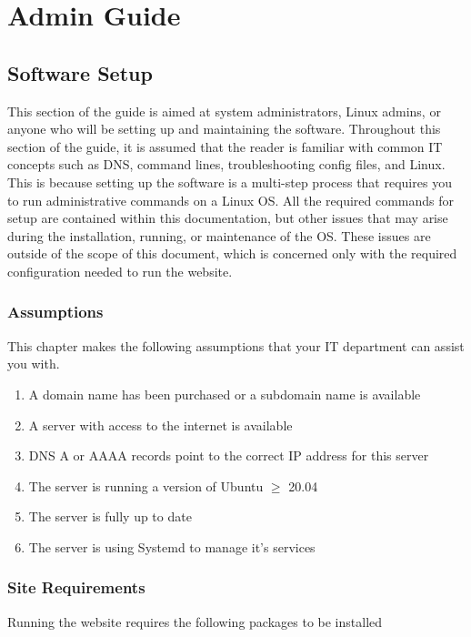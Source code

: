 \part{Admin Guide} \label{administrative_guide}
\chapter{Software Setup} \label{software_setup}
This section of the guide is aimed at system administrators, Linux admins, or anyone who will be setting up and maintaining the software. Throughout this section of the guide, it is assumed that the reader is familiar with common IT concepts such as DNS, command lines, troubleshooting config files, and Linux. This is because setting up the software is a multi-step process that requires you to run administrative commands on a Linux OS. All the required commands for setup are contained within this documentation, but other issues that may arise during the installation, running, or maintenance of the OS. These issues are outside of the scope of this document, which is concerned only with the required configuration needed to run the website.

\section{Assumptions}

This chapter makes the following assumptions that your IT department can assist you with.

\begin{enumerate}
    \item A domain name has been purchased or a subdomain name is available
    \item A server with access to the internet is available
    \item DNS A or AAAA records point to the correct IP address for this server
    \item The server is running a version of Ubuntu $\geq$ 20.04
    \item The server is fully up to date
    \item The server is using Systemd to manage it's services
\end{enumerate}

\section{Site Requirements} \label{site_requirements}

Running the website requires the following packages to be installed


